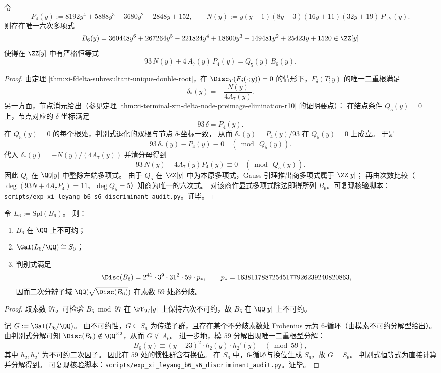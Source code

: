 \begin{theorem}\label{thm:xi-leyang-b6-from-node-vs-double-root}
令
\[
P_4(y):=8192y^4+5888y^3-3680y^2-2848y+152,
\qquad
N(y):=y(y-1)(8y-3)(16y+11)(32y+19)\,P_{\mathrm{LY}}(y).
\]
则存在唯一六次多项式
\[
B_6(y)=360448y^6+267264y^5-221824y^4+18600y^3+149481y^2+25423y+1520\in\ZZ[y]
\]
使得在 \(\ZZ[y]\) 中有严格恒等式
\[
93\,N(y)+4\,A_7(y)\,P_4(y)=Q_5(y)\,B_6(y).
\]
\end{theorem}
\begin{proof}
由定理 \ref{thm:xi-fdelta-subresultant-unique-double-root}，在 \(\Disc_T(F_\delta(\cdot;y))=0\) 的情形下，\(F_\delta(T;y)\) 的唯一二重根满足
\[
\delta_\ast(y)=-\frac{N(y)}{4A_7(y)}.
\]
另一方面，节点消元给出（参见定理 \ref{thm:xi-terminal-zm-delta-node-preimage-elimination-r10} 的证明要点）：
在结点条件 \(Q_5(y)=0\) 上，节点对应的 \(\delta\)-坐标满足
\[
93\,\delta=P_4(y).
\]
在 \(Q_5(y)=0\) 的每个根处，判别式退化的双根与节点 \(\delta\)-坐标一致，
从而 \(\delta_\ast(y)=P_4(y)/93\) 在 \(Q_5(y)=0\) 上成立。
于是
\[
93\,\delta_\ast(y)-P_4(y)\equiv 0\quad(\bmod\ Q_5(y)).
\]
代入 \(\delta_\ast(y)=-N(y)/(4A_7(y))\) 并清分母得到
\[
93\,N(y)+4A_7(y)P_4(y)\equiv 0\quad(\bmod\ Q_5(y)).
\]
因此 \(Q_5\) 在 \(\QQ[y]\) 中整除左端多项式。
由于 \(Q_5\) 在 \(\ZZ[y]\) 中为本原多项式，Gauss 引理推出商多项式属于 \(\ZZ[y]\)；
再由次数比较（\(\deg(93N+4A_7P_4)=11\)、\(\deg Q_5=5\)）知商为唯一的六次式。
对该商作显式多项式除法即得所列 \(B_6\)。可复现核验脚本：\texttt{scripts/exp\_xi\_leyang\_b6\_s6\_discriminant\_audit.py}。证毕。
\end{proof}

\begin{theorem}[六次商多项式的满对称伽罗瓦群与敏感素数 \(59\)]\label{thm:xi-leyang-b6-galois-s6}
令 \(L_6:=\mathrm{Spl}(B_6)\)。
则：
\begin{enumerate}
  \item \(B_6\) 在 \(\QQ\) 上不可约；
  \item \(\Gal(L_6/\QQ)\cong S_6\)；
  \item 判别式满足
  \[
  \Disc(B_6)=2^{41}\cdot 3^{9}\cdot 31^{2}\cdot 59\cdot p_\ast,
  \qquad
  p_\ast=16381178872545177926239240820863,
  \]
  因而二次分辨子域 \(\QQ(\sqrt{\Disc(B_6)})\) 在素数 \(59\) 处必分歧。
\end{enumerate}
\end{theorem}
\begin{proof}
取素数 \(97\)。可检验 \(B_6\bmod 97\) 在 \(\FF_{97}[y]\) 上保持六次不可约，故 \(B_6\) 在 \(\QQ[y]\) 上不可约。
\par
记 \(G:=\Gal(L_6/\QQ)\)。
由不可约性，\(G\subseteq S_6\) 为传递子群，且存在某个不分歧素数处 Frobenius 元为 \(6\)-循环（由模素不可约分解型给出）。
由判别式分解可知 \(\Disc(B_6)\notin \QQ^{\times 2}\)，从而 \(G\nsubseteq A_6\)。
进一步地，模 \(59\) 分解出现唯一二重根型分解：
\[
B_6(y)\equiv (y-23)^2\cdot h_2(y)\cdot h_2'(y)\quad(\bmod 59),
\]
其中 \(h_2,h_2'\) 为不可约二次因子。
因此在 \(59\) 处的惯性群含有换位。
在 \(S_6\) 中，\(6\)-循环与换位生成 \(S_6\)，故 \(G=S_6\)。
判别式恒等式为直接计算并分解得到。
可复现核验脚本：\texttt{scripts/exp\_xi\_leyang\_b6\_s6\_discriminant\_audit.py}。证毕。
\end{proof}

